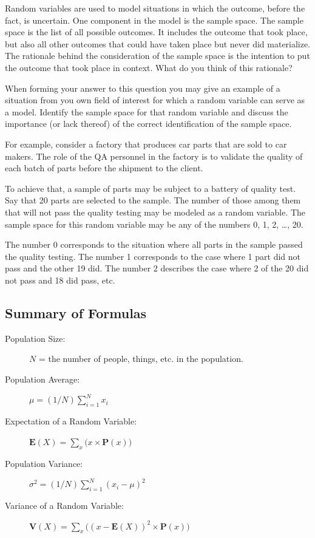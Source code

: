 \documentclass[]{krantz}
\newcommand{\Expec}{\mathbf{E}}
\newcommand{\Prob}{\mathbf{P}}
\newcommand{\Var}{\mathbf{V}}
\theoremstyle{definition}
\theoremstyle{definition}
\theoremstyle{definition}
\theoremstyle{remark}
\begin{document}
Random variables are used to model situations in which the outcome,
before the fact, is uncertain. One component in the model is the sample
space. The sample space is the list of all possible outcomes. It
includes the outcome that took place, but also all other outcomes that
could have taken place but never did materialize. The rationale behind
the consideration of the sample space is the intention to put the
outcome that took place in context. What do you think of this rationale?

When forming your answer to this question you may give an example of a
situation from you own field of interest for which a random variable can
serve as a model. Identify the sample space for that random variable and
discuss the importance (or lack thereof) of the correct identification
of the sample space.

For example, consider a factory that produces car parts that are sold to
car makers. The role of the QA personnel in the factory is to validate
the quality of each batch of parts before the shipment to the client.

To achieve that, a sample of parts may be subject to a battery of
quality test. Say that 20 parts are selected to the sample. The number
of those among them that will not pass the quality testing may be
modeled as a random variable. The sample space for this random variable
may be any of the numbers 0, 1, 2, \ldots{}, 20.

The number 0 corresponds to the situation where all parts in the sample
passed the quality testing. The number 1 corresponds to the case where 1
part did not pass and the other 19 did. The number 2 describes the case
where 2 of the 20 did not pass and 18 did pass, etc.

\hypertarget{summary-of-formulas}{%
\subsection*{Summary of Formulas}\label{summary-of-formulas}}


\begin{description}
\item[Population Size:]
\(N\) = the number of people, things, etc. in the population.
\item[Population Average:]
\(\mu = (1/N)\sum_{i=1}^N x_i\)
\item[Expectation of a Random Variable:]
\(\Expec(X) = \sum_x \big(x \times \Prob(x)\big)\)
\item[Population Variance:]
\(\sigma^2 = (1/N)\sum_{i=1}^N (x_i-\mu)^2\)
\item[Variance of a Random Variable:]
\(\Var(X) = \sum_x\big( (x-\Expec(X))^2 \times \Prob(x)\big)\)
\end{description}
\end{document}
